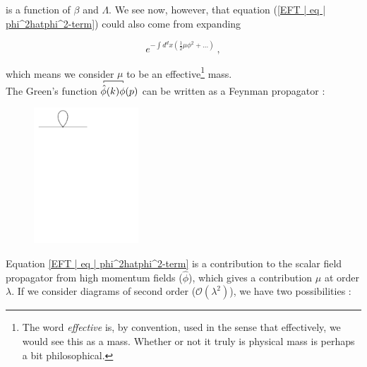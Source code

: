 \documentclass[10pt,twoside]{report}
\begin{document}
	\noindent is a function of $\beta$ and $\Lambda$. We see now, however, that equation (\ref{EFT | eq | phi^2hatphi^2-term}) could also come from expanding
	
	\begin{equation}
		e^{-\int d^dx \left(\frac{1}{2}\mu\phi^2 + \ldots\right)}\:,
	\end{equation}
	
	\noindent which means we consider $\mu$ to be an effective\footnote{The word \emph{effective} is, by convention, used in the sense that effectively, we would see this as a mass. Whether or not it truly is physical mass is perhaps a bit philosophical.} mass.\\
	
	The Green's function $\contraction[2pt]{}{\hat{\phi}}{(k)}{\phi}\hat{\phi}(k)\phi(p)$ can be written as a Feynman propagator \cite{PeskinSchroeder}:
	
	\begin{figure}[h]
		\centering
		\includegraphics[trim={0.5cm 22cm 10cm 0cm},width=0.35\textwidth]{Figures/renorm1.pdf}
		\vspace{-0.5cm}
		\label{fey:2}
	\end{figure}
	
	Equation \ref{EFT | eq | phi^2hatphi^2-term} is a contribution to the scalar field propagator from high momentum fields ($\hat{\phi}$), which gives a contribution $\mu$ at order $\lambda$.
	If we consider diagrams of second order ($\mathcal{O}(\lambda^2)$), we have two possibilities \cite{PeskinSchroeder}:
	
\end{document}
